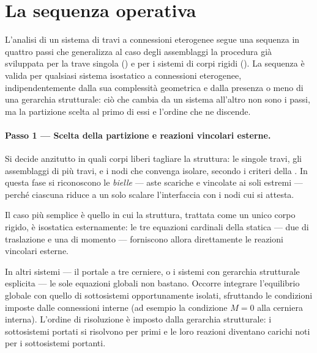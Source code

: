 \section{La sequenza operativa}
\label{sec:sequenza_operativa}

L'analisi di un sistema di travi a connessioni
eterogenee segue una sequenza in quattro passi che
generalizza al caso degli assemblaggi la procedura
già sviluppata per la trave singola
() e per i sistemi di
corpi rigidi ().
La sequenza è valida per qualsiasi sistema isostatico a
connessioni eterogenee, indipendentemente dalla sua
complessità geometrica e dalla presenza o meno di una
gerarchia strutturale: ciò che cambia da un sistema
all'altro non sono i passi, ma la partizione scelta al
primo di essi e l'ordine che ne discende.

\paragraph{Passo 1 --- Scelta della partizione e
	reazioni vincolari esterne.}

Si decide anzitutto in quali corpi liberi tagliare la
struttura: le singole travi, gli assemblaggi di più travi,
e i nodi che convenga isolare, secondo i criteri della
. In questa fase si riconoscono le
\emph{bielle} --- aste scariche e vincolate ai soli
estremi --- perché ciascuna riduce a un solo scalare
l'interfaccia con i nodi cui si attesta.

Il caso più semplice è quello in cui la struttura, trattata
come un unico corpo rigido, è isostatica esternamente: le
tre equazioni cardinali della statica --- due di traslazione
e una di momento --- forniscono allora direttamente le
reazioni vincolari esterne.

In altri sistemi --- il portale a tre cerniere, o i sistemi
con gerarchia strutturale esplicita --- le sole equazioni
globali non bastano. Occorre integrare l'equilibrio globale
con quello di sottosistemi opportunamente isolati,
sfruttando le condizioni imposte dalle connessioni interne
(ad esempio la condizione $M = 0$ alla cerniera interna).
L'ordine di risoluzione è imposto dalla gerarchia
strutturale: i sottosistemi portati si risolvono per primi e
le loro reazioni diventano carichi noti per i sottosistemi
portanti.

